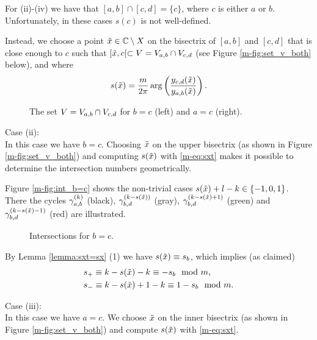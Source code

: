 \documentclass[main.tex]{subfiles}
\begin{document}
  For (ii)-(iv) we have that $[a,b] \cap [c,d] = \{c \}$, where $c$ is either $a$ or $b$. Unfortunately, in these cases $s(c)$ is not
  well-defined.

 Instead, we choose a point $\tilde{x} \in \mathbb{C} \setminus X$ on the bisectrix of
  $[a,b]$ and $[c,d]$ that is close enough to $c$ such that $[\tilde{x},c[ \subset V = V_{a,b} \cap V_{c,d}$
  (see Figure \ref{m-fig:set_v_both} below), and where
  \begin{equation}\label{eq:sxt}
   s(\tilde{x}) = \frac{m}{2\pi} \arg \left( \frac{y_{c,d}(\tilde{x})}{y_{a,b}(\tilde{x})} \right).
  \end{equation}
    \begin{figure}[H]
      \begin{center}
   \scalebox{.7}{}
      \end{center}
     \vspace{-1cm}
    \caption{The set $V = V_{a,b} \cap V_{c,d}$ for $b=c$ (left) and $a=c$ (right).}
    \label{fig:set_v_both}
   \end{figure}

   Case (ii): \\
   In this case we have $b = c$. Choosing $\tilde{x}$ on the upper bisectrix (as shown in Figure \ref{m-fig:set_v_both})
   and computing $s(\tilde{x})$ with \eqref{m-eq:sxt} makes it possible to determine the intersection numbers geometrically.

   Figure \ref{m-fig:int_b=c} shows the non-trivial cases $s(\tilde{x}) + l - k \in \{-1,0,1\}$.
   There the cycles $\gamma_{a,b}^{(k)}$ (black), $\gamma_{b,d}^{(k-s(\tilde{x}))}$ (gray), $\gamma_{b,d}^{(k-s(\tilde{x}) + 1)}$ (green) and
    $\gamma_{b,d}^{(k-s(\tilde{x})-1)}$ (red) are illustrated.
    \begin{figure}[H]
      \begin{center}
   \scalebox{0.8}{}
      \end{center}
    \caption{Intersections for $b=c$.}
    \label{fig:int_b=c}
   \end{figure}
    By Lemma \ref{lemma:sxt=sx} (1) we have $s(\tilde{x}) \equiv s_b$, which implies (as claimed)
    \begin{align*}
    & s_+ \equiv k-s(\tilde{x})-k \equiv -s_b \mod m, \\
    & s_- \equiv k-s(\tilde{x})+1-k \equiv 1-s_b \mod m.
    \end{align*}

 Case (iii): \\
 In this case we have $a = c$. We choose $\tilde{x}$ on the inner bisectrix (as shown in Figure \ref{m-fig:set_v_both})
   and compute $s(\tilde{x})$ with \eqref{m-eq:sxt}.
\end{document}
